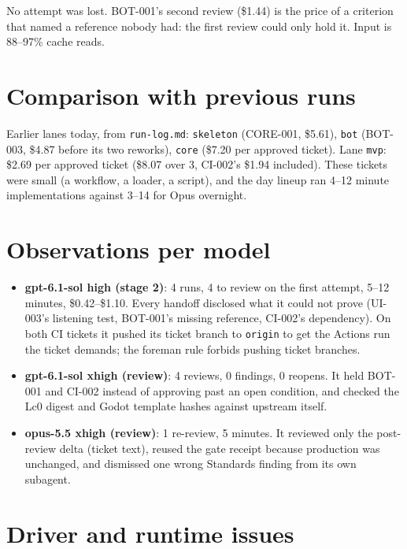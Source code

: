 \documentclass[11pt,a4paper]{article}
\begin{document}
No attempt was lost. BOT-001's second review (\$1.44) is the price of a criterion that named a
reference nobody had: the first review could only hold it. Input is 88--97\% cache reads.

\section*{Comparison with previous runs}

Earlier lanes today, from \texttt{run-log.md}: \texttt{skeleton} (CORE-001, \$5.61),
\texttt{bot} (BOT-003, \$4.87 before its two reworks), \texttt{core} (\$7.20 per approved
ticket). Lane \texttt{mvp}: \$2.69 per approved ticket (\$8.07 over 3, CI-002's \$1.94
included). These tickets were small (a workflow, a loader, a script), and the day lineup ran
4--12 minute implementations against 3--14 for Opus overnight.

\section*{Observations per model}

\begin{itemize}
  \item \textbf{gpt-6.1-sol high (stage 2)}: 4 runs, 4 to review on the first attempt, 5--12
        minutes, \$0.42--\$1.10. Every handoff disclosed what it could not prove (UI-003's
        listening test, BOT-001's missing reference, CI-002's dependency). On both CI tickets
        it pushed its ticket branch to \texttt{origin} to get the Actions run the ticket
        demands; the foreman rule forbids pushing ticket branches.
  \item \textbf{gpt-6.1-sol xhigh (review)}: 4 reviews, 0 findings, 0 reopens. It held BOT-001
        and CI-002 instead of approving past an open condition, and checked the Lc0 digest
        and Godot template hashes against upstream itself.
  \item \textbf{opus-5.5 xhigh (review)}: 1 re-review, 5 minutes. It reviewed only the
        post-review delta (ticket text), reused the gate receipt because production was
        unchanged, and dismissed one wrong Standards finding from its own subagent.
\end{itemize}

\section*{Driver and runtime issues}
\end{document}
